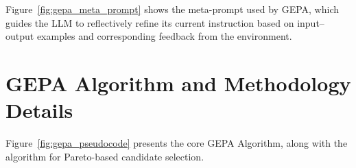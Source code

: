 \documentclass{article} %
\begin{document}




Figure~\ref{fig:gepa_meta_prompt} shows the meta-prompt used by GEPA, which guides the LLM to reflectively refine its current instruction based on input–output examples and corresponding feedback from the environment.

\section{GEPA Algorithm and Methodology Details}\label{appendix:gepa_algorithm_details}
Figure~\ref{fig:gepa_pseudocode} presents the core GEPA Algorithm, along with the algorithm for Pareto-based candidate selection.
\end{document}
